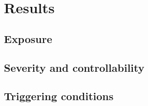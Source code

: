 \section{Results}
\label{sec:results}



\subsection{Exposure}
\label{sec:exposure results}



\subsection{Severity and controllability}
\label{sec:main results}



\subsection{Triggering conditions}
\label{sec:results triggering conditions}
